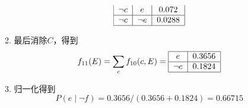 \documentclass[a4paper, 11pt]{article}
\begin{document}
\begin{answer}
\begin{itemize}
\begin{enumerate}
\[{\begin{tabular}{|c|c|c|}
            $\lnot c$ & $e$ & $0.072$\\\hline
            $\lnot c$ & $\lnot e$ & $0.0288$\\\hline
        \end{tabular}}\]
        \item 最后消除$C$，得到
        \[f_{11}(E)=\sum_c f_{10}(c,E)=\text{\begin{tabular}{|c|c|}\hline
            $e$ & $0.3656$\\\hline
            $\lnot e$ & $0.1824$\\\hline
        \end{tabular}}\]
        \item 归一化得到
        \[P(e\mid\lnot f)=0.3656/(0.3656+0.1824)=0.66715\]
    \end{enumerate}
\end{itemize}
\end{answer}
\end{document}
